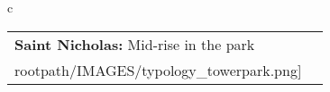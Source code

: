 \begin{table}[H]
        \begin{tabular}{c}
        \begin{tabular}{m{1.5in} m{2in}}
\textbf{Saint Nicholas:} {Mid-rise in the park} & \texttt{[image: \\rootpath/IMAGES/typology\_towerpark.png]}
\end{tabular}\end{tabular}
        \end{table}